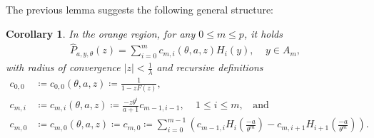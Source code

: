 \documentclass[12pt]{article}
\newcommand{\1}{\mathds{1}}
\theoremstyle{definition}
\theoremstyle{plain}
\newtheorem{Corollary}[definition]{Corollary}
\theoremstyle{remark}
\begin{document}
The previous lemma suggests the following general structure:
\begin{Corollary}\label{orange_GF_rekursive_coeff}
    In the orange region, for any $0\le m\le p$, it holds
    \begin{align*}
        \hat{P}_{a,y,\theta}(z)=\sum_{i=0}^mc_{m,i}(\theta,a,z)H_i(y),~~~~~y\in A_m,
    \end{align*}
   with radius of convergence $|z|<\frac{1}{\lambda}$ and recursive definitions
    \begin{align*}
   c_{0,0}&\coloneqq c_{0,0}(\theta,a,z)\coloneqq \frac{1}{1-zF(z)},
        \\c_{m,i}&\coloneqq c_{m,i}(\theta,a,z)\coloneqq \frac{-z\theta^i}{a+1}c_{m-1,i-1},~~~~~1\le i\le m,~~~~\text{and}
        \\c_{m,0}&\coloneqq c_{m,0}(\theta,a,z)\coloneqq c_{m,0}\coloneqq\sum_{i=0}^{m-1}\left(c_{m-1,i}H_i\left(\frac{-a}{\theta^m}\right)-c_{m,i+1}H_{i+1}\left(\frac{-a}{\theta^{m}}\right)\right).
\end{align*}
\end{Corollary}
\end{document}

